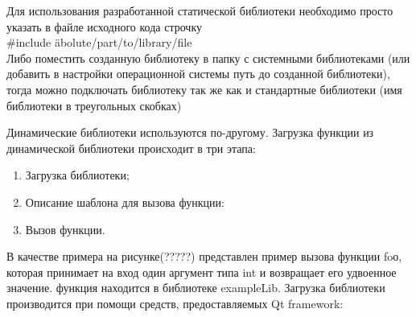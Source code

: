 Для использования разработанной статической библиотеки необходимо просто указать в файле исходного кода строчку \\
#include \"abolute/part/to/library/file\" \\
Либо поместить созданную библиотеку в папку с системными библиотеками (или добавить в настройки операционной системы путь до созданной библиотеки), тогда можно подключать библиотеку так же как и стандартные библиотеки (имя библиотеки в треугольных скобках)

Динамические библиотеки используются по-другому. Загрузка функции из динамической библиотеки происходит в три этапа: \\
\begin{enumerate}
\item Загрузка библиотеки;
\item Описание шаблона для вызова функции:
\item Вызов функции.
\end{enumerate}

В качестве примера на рисунке(?????) представлен пример вызова функции foо, которая принимает на вход один аргумент типа int и возвращает его удвоенное значение. функция находится в библиотеке exampleLib. Загрузка библиотеки производится при помощи средств, предоставляемых Qt framework: \\

